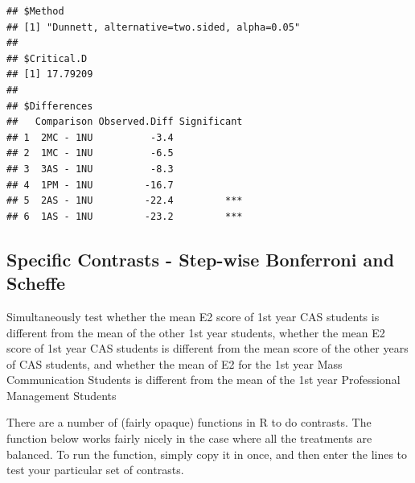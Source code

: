 \documentclass[
]{book}
\begin{document}
\begin{verbatim}
## $Method
## [1] "Dunnett, alternative=two.sided, alpha=0.05"
## 
## $Critical.D
## [1] 17.79209
## 
## $Differences
##   Comparison Observed.Diff Significant
## 1  2MC - 1NU          -3.4            
## 2  1MC - 1NU          -6.5            
## 3  3AS - 1NU          -8.3            
## 4  1PM - 1NU         -16.7            
## 5  2AS - 1NU         -22.4         ***
## 6  1AS - 1NU         -23.2         ***
\end{verbatim}

\hypertarget{specific-contrasts---step-wise-bonferroni-and-scheffe}{%
\subsection{Specific Contrasts - Step-wise Bonferroni and Scheffe}\label{specific-contrasts---step-wise-bonferroni-and-scheffe}}

Simultaneously test whether the mean E2 score of 1st year CAS students is different from the mean of the other 1st year students, whether the mean E2 score of 1st year CAS students is different from the mean score of the other years of CAS students, and whether the mean of E2 for the 1st year Mass Communication Students is different from the mean of the 1st year Professional Management Students

There are a number of (fairly opaque) functions in R to do contrasts. The function below works fairly nicely in the case where all the treatments are balanced. To run the function, simply copy it in once, and then enter the lines to test your particular set of contrasts.
\end{document}
